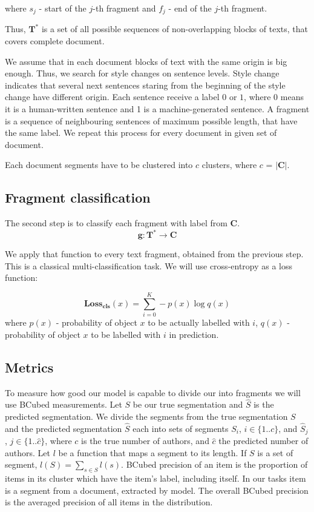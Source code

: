 \documentclass{article}
\begin{document}
where $s_j$ - start of the $j$-th fragment and $f_j$ - end of the $j$-th fragment.

Thus, $\mathbf{T}^*$ is a set of all possible sequences of non-overlapping blocks of texts, that covers complete document.

We assume that in each document blocks of text with the same origin is big enough. Thus, we search for style changes on sentence levels. Style change indicates that several next sentences staring from the beginning of the style change have different origin. Each sentence receive a label $0$ or $1$, where 0 means it is a human-written sentence and 1 is a machine-generated sentence. A fragment is a sequence of neighbouring sentences of maximum possible length, that have the same label. We repeat this process for every document in given set of document. 

Each document segments have to be clustered into $c$ clusters, where $c$  =  $|\textbf{C}|$. 

\subsection{Fragment classification}

The second step is to classify each fragment with label from $\mathbf{C}$.
$$\mathbf{g}: \mathbf{T}^* \rightarrow \mathbf{C}$$

We apply that function to every text fragment, obtained from the previous step. This is a classical multi-classification task. We will use cross-entropy as a loss function:

$$\mathbf{Loss_{cls}}(x) = \sum_{i=0}^K-p(x)\log q(x)$$ 
where $p(x)$ - probability of object $x$ to be actually labelled with $i$,
$q(x)$ -  probability of object $x$ to be labelled with $i$  in prediction.

\subsection{Metrics}

To measure how good our model is capable to divide our into fragments we will use BCubed\cite{bcubed} measurements.
Let $S$ be our true segmentation and $\hat{S}$  is the predicted segmentation. We divide the segments from the true segmentation $S$ and the predicted segmentation $\hat{S}$ each into sets of segments $S_i$, $i\in\{1..c\}$, and $\hat{S}_j$, $j\in\{1..\hat{c}\}$, where $c$ is the true number of authors, and $\hat{c}$ the predicted number of authors. Let $l$ be a function that maps a segment to its length. If $S$ is a set of segment, $l(S) = \sum_{s \in S}l(s)$. BCubed precision of an item is the proportion of items in its cluster which have the item’s label, including itself. In our tasks item is a segment from a document, extracted by model. The overall BCubed precision is the averaged precision of all items in the distribution.  
\end{document}
